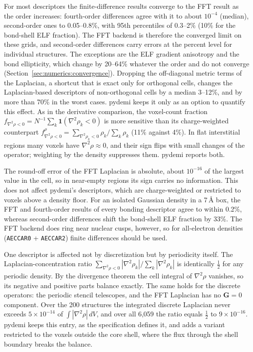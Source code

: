 \documentclass[11pt,a4paper]{article}
\begin{document}
For most descriptors the finite-difference results converge to the FFT result
as the order increases: fourth-order differences agree with it to about
$10^{-4}$ (median), second-order ones to 0.05--0.8\%, with 95th percentiles
of 0.3--2\% (10\% for the bond-shell ELF fraction). The FFT backend is therefore the converged limit on
these grids, and second-order differences carry errors at the percent level
for individual structures. The exceptions are the ELF gradient anisotropy and
the bond ellipticity, which change by 20--64\% whatever the order and do not
converge (Section~\ref{sec:numerics:convergence}). Dropping the off-diagonal
metric terms of the Laplacian, a shortcut that is exact only for orthogonal
cells, changes the Laplacian-based descriptors of non-orthogonal cells by a
median 3--12\%, and by more than 70\% in the worst cases. pydemi keeps it only as an option to quantify
this effect. As in the derivative comparison, the voxel-count fraction
$f_{\nabla^2\rho<0}=N^{-1}\sum_k\mathbf{1}(\nabla^2\rho_k<0)$ is more sensitive
than its charge-weighted counterpart
$f^{\rho}_{\nabla^2\rho<0}=\sum_{\nabla^2\rho_k<0}\rho_k/\sum_k\rho_k$ (11\%
against 4\%). In flat interstitial regions many voxels have
$\nabla^2\rho\approx0$, and their sign flips with small changes of the
operator; weighting by the density suppresses them. pydemi reports both.

The round-off error of the FFT Laplacian is absolute, about $10^{-16}$ of the
largest value in the cell, so in near-empty regions its sign carries no
information. This does not affect pydemi's descriptors, which are
charge-weighted or restricted to voxels above a density floor. For an
isolated Gaussian density in a 7\,\AA{} box, the FFT and fourth-order results of
every bonding descriptor agree to within 0.2\%, whereas second-order
differences shift the bond-shell ELF fraction by 33\%. The FFT backend does
ring near nuclear cusps, however, so for all-electron densities
(\texttt{AECCAR0} + \texttt{AECCAR2}) finite differences should be used.

One descriptor is affected not by discretization but by periodicity itself.
The Laplacian-concentration ratio $\sum_{\nabla^2\rho<0}|\nabla^2\rho_k| /
\sum_k|\nabla^2\rho_k|$ is identically $\tfrac{1}{2}$ for any periodic density.
By the divergence theorem the cell integral of $\nabla^2\rho$ vanishes, so its
negative and positive parts balance exactly. The same holds for the discrete
operators: the periodic stencil telescopes, and the FFT Laplacian has no
$\mathbf{G}=0$ component. Over the 200 structures the integrated discrete
Laplacian never exceeds $5\times10^{-14}$ of $\int|\nabla^2\rho|\,dV$, and over
all 6,059 the ratio equals $\tfrac{1}{2}$ to $9\times10^{-16}$. pydemi keeps this
entry, as the specification defines it, and adds a variant restricted to the
voxels outside the core shell, where the flux through the shell boundary
breaks the balance.
\end{document}
